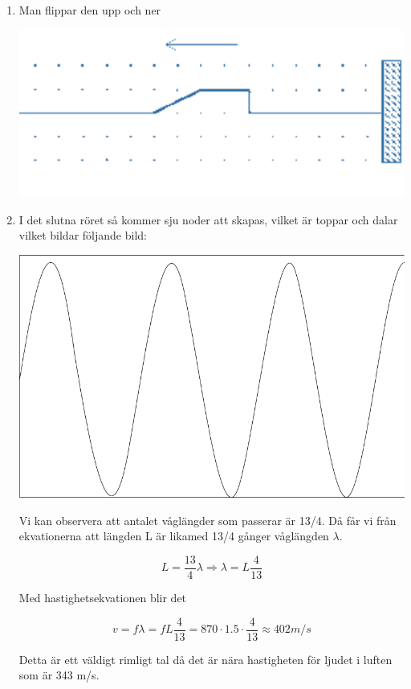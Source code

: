 \documentclass[a4paper,12pt]{article}
\begin{document}
\begin{enumerate}
    \item Man flippar den upp och ner
    
    \includegraphics{Figur 1.png}
    
    \item 
    I det slutna röret så kommer sju noder att skapas,
    vilket är toppar och dalar vilket bildar följande bild:
    \begin{center}
        \includegraphics[scale=0.5]{Figur 2.png}
    \end{center}

    Vi kan observera att antalet våglängder som passerar
    är 13/4. Då får vi från ekvationerna att längden L är 
    likamed 13/4 gånger våglängden $\lambda$.

    $$L=\frac{13}{4}\lambda \Rightarrow \lambda=L\frac{4}{13}$$

    Med hastighetsekvationen blir det 

    $$v=f\lambda=fL\frac{4}{13}=870\cdot 1.5\cdot \frac{4}{13}\approx 402m/s$$

    Detta är ett väldigt rimligt tal då det är nära hastigheten 
    för ljudet i luften som är 343 m/s.
    

\end{enumerate}
\end{document}
